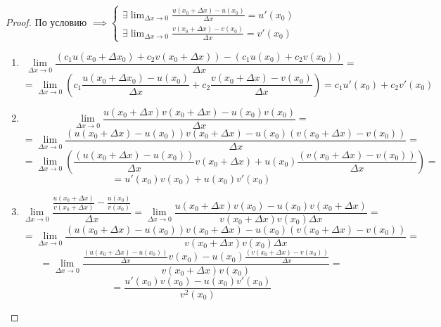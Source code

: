 \documentclass[a4paper,oneside]{article}
\newcommand{\dslim}{\displaystyle\lim}
\theoremstyle{definition}
\theoremstyle{definition}
\theoremstyle{definition}
\begin{document}
\begin{proof}
    По условию $\implies \begin{cases}
        \exists \dslim_{\Delta x \to 0} \frac{u(x_0 + \Delta x) - u(x_0)}{\Delta x} = u'(x_0) \\
        \exists \dslim_{\Delta x \to 0} \frac{v(x_0 + \Delta x) - v(x_0)}{\Delta x} = v'(x_0)
    \end{cases}$

    \begin{enumerate}[label=\alph*)]
        \item
            \[ \dslim_{\Delta x \to 0} \frac{(c_1 u(x_0 + \Delta x_0) + c_2 v(x_0 + \Delta x)) - (c_1 u(x_0) + c_2 v(x_0))}{\Delta x} = \]
            \[ 
                = \dslim_{\Delta x \to 0} \left( c_1 \frac{u(x_0 + \Delta x_0) - u(x_0)}{\Delta x} + c_2 \frac{v(x_0 + \Delta x) - v(x_0)}{\Delta x} \right) 
                = c_1 u'(x_0) + c_2 v'(x_0) 
            \]

        \item 
            \[ \dslim_{\Delta x \to 0} \frac{u(x_0 + \Delta x) v(x_0 + \Delta x) - u(x_0) v(x_0)}{\Delta x} = \]
            \[ = \dslim_{\Delta x \to 0} \frac{(u(x_0 + \Delta x) - u(x_0)) v(x_0 + \Delta x) - u(x_0) (v(x_0 + \Delta x) - v(x_0))}{\Delta x} = \]
            \[ = \dslim_{\Delta x \to 0} \left( \frac{(u(x_0 + \Delta x) - u(x_0))}{\Delta x} v(x_0 + \Delta x) + u(x_0) \frac{(v(x_0 + \Delta x) - v(x_0))}{\Delta x} \right) = \]
            \[ = u'(x_0) v(x_0) + u(x_0) v'(x_0) \]

        \item
            \[
                \dslim_{\Delta x \to 0} \frac{ \frac{u(x_0 + \Delta x)}{v(x_0 + \Delta x)} - \frac{u(x_0)}{v(x_0)} }{\Delta x}
                = \dslim_{\Delta x \to 0} \frac{ u(x_0 + \Delta x) v(x_0) - u(x_0) v(x_0 + \Delta x) }{ v(x_0 + \Delta x) v(x_0) \Delta x } =
            \]
            \[ = \dslim_{\Delta x \to 0} \frac{(u(x_0 + \Delta x) - u(x_0)) v(x_0 + \Delta x) - u(x_0) (v(x_0 + \Delta x) - v(x_0))}{ v(x_0 + \Delta x) v(x_0) \Delta x } = \]
            \[ = \dslim_{\Delta x \to 0} \frac{ \frac{(u(x_0 + \Delta x) - u(x_0))}{\Delta x} v(x_0) - u(x_0) \frac{(v(x_0 + \Delta x) - v(x_0))}{\Delta x} }{v(x_0 + \Delta x) v(x_0)} = \]
            \[ = \frac{u'(x_0) v(x_0) - u(x_0) v'(x_0)}{v^2(x_0)} \]
    \end{enumerate}
\end{proof}
\end{document}
